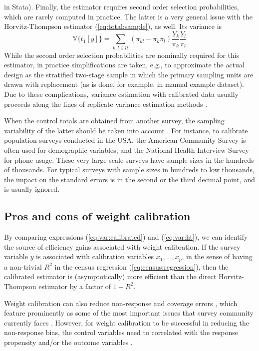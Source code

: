 in Stata). Finally, the estimator requires second order selection probabilities,
which are rarely computed in practice. The latter is a very general issue
with the Horvitz-Thompson estimator (\ref{eq:total:sample}), as well.
Its variance is
\begin{equation}
    \mathbb{V}\bigl\{t_{1}[y]\bigr\} = \sum_{k,l \in \mathcal{U}}
        (\pi_{kl}-\pi_k \pi_l)
        \frac{Y_k}{\pi_k}
        \frac{Y_l}{\pi_l}
    \label{eq:var:ht}
\end{equation}
While the second order selection probabilities are nominally required
for this estimator, in practice simplifications are taken, e.g.,
to approximate the actual design as the stratified two-stage sample
in which the primary sampling units are drawn with replacement
(as is done, for example, in  \svyref{} manual example
dataset). Due to these complications, variance estimation with
calibrated data usually proceeds along the lines of
replicate variance estimation methods \citep{shao:1996,kolenikov:2010}.

When the control totals are obtained from another survey,
the sampling variability of the latter should be taken
into account \citep{dever:valliant:2010}. For instance,
to calibrate population surveys conducted in the USA,
the American Community Survey \citep{acs:2009}
is often used for demographic variables,
and the National Health Interview Survey \citep{nhis:2000} for phone usage.
These very large scale surveys have sample sizes in the hundreds of thousands.
For typical surveys with sample sizes in hundreds to low thousands,
the impact on the standard errors is in the second or the third
decimal point, and is usually ignored.


\subsection{Pros and cons of weight calibration}
\label{subsec:pro:con}

By comparing expressions (\ref{eq:var:calibrated}) and
(\ref{eq:var:ht}), we can identify the source of efficiency gains
associated with weight calibration. If the survey variable
$y$ is associated with calibration variables $x_1,\ldots,x_p$,
in the sense of having a non-trivial $R^2$ in the census regression
(\ref{eq:census:regression}),
then the calibrated estimator is (asymptotically)
more efficient than the direct Horvitz-Thompson estimator
by a factor of $1-R^2$.

Weight calibration can also reduce non-response
and coverage errors
\citep{chang:kott:2008,kott:2006,lund:sarn:1999}, which
feature prominently as some of the most important issues
that survey community currently faces \citep{groves:2006}.
However, for weight calibration to be successful in
reducing the non-response bias, the control variables
need to correlated with the response propensity and/or the outcome
variables \citep{bethlehem:2002,judkins:etal:2007}.

